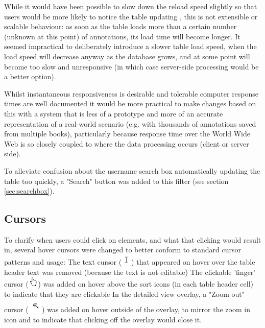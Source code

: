 While it would have been possible to slow down the reload speed slightly so that users would be more likely to notice the table updating \citep[p. 282]{Shneiderman1984}, this is not extensible or scalable behaviour: as soon as the table loads more than a certain number (unknown at this point) of annotations, its load time will become longer. It seemed impractical to deliberately introduce a slower table load speed, when the load speed will decrease anyway as the database grows, and at some point will become too slow and unresponsive (in which case server-side processing would be a better option). 

Whilst instantaneous responsiveness is desirable \citep[p. 272]{DixFinlay} and tolerable computer response times are well documented \citep[p. 154]{Nah} it would be more practical to make changes based on this with a system that is less of a prototype and more of an accurate representation of a real-world scenario (e.g. with thousands of annotations saved from multiple books), particularly because response time over the World Wide Web is so closely coupled to where the data processing occurs (client or server side). 

To alleviate confusion about the username search box automatically updating the table too quickly, a "Search" button was added to this filter (see section \ref{sec:searchbox}). 

\subsection{Cursors}
To clarify when users could click on elements, and what that clicking would result in, several hover cursors were changed to better conform to standard cursor patterns and usage:
The text cursor (\includegraphics[width=0.5cm]{Figures/textcursor.png}) that appeared on hover over the table header text was removed (because the text is not editable)
The clickable 'finger' cursor (\includegraphics[width=0.5cm]{Figures/handcursor.png}) was added on hover above the sort icons (in each table header cell) to indicate that they are clickable
In the detailed view overlay, a "Zoom out" cursor (\includegraphics[width=0.7cm]{Figures/V2/zoomout.png}) was added on hover outside of the overlay, to mirror the zoom in icon and to indicate that clicking off the overlay would close it. 


